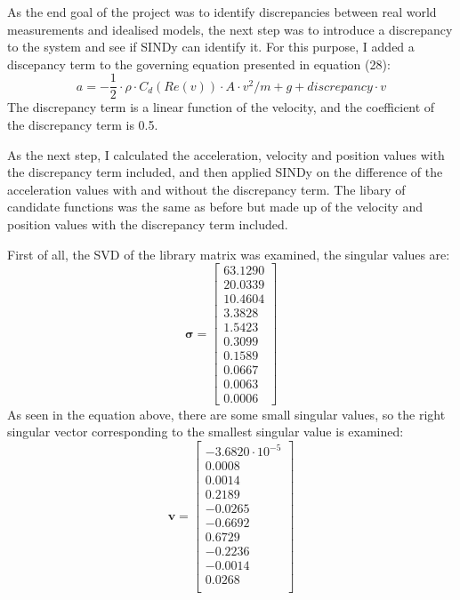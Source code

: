 ﻿\documentclass[12pt,a4paper]{article}
\begin{document}
As the end goal of the project was to identify discrepancies between
real world measurements and idealised models, the next step was to
introduce a discrepancy to the system and see if SINDy can identify it.
For this purpose, I added a discepancy term to the governing equation
presented in equation (28):
\begin{equation}
    a = - \frac{1}{2} \cdot \rho \cdot C_d(Re(v)) \cdot A \cdot v^2 / m + g + discrepancy \cdot v
\end{equation}
The discrepancy term is a linear function of the velocity, and the 
coefficient of the discrepancy term is 0.5. \par
As the next step, I calculated the acceleration, velocity and position values
with the discrepancy term included, and then applied SINDy on the
difference of the acceleration values with and without the discrepancy term.
The libary of candidate functions was the same as before but made up
of the velocity and position values with the discrepancy term included.\par
First of all, the SVD of the library matrix was examined, the singular values are:
\begin{equation}
    \bm{\sigma} = \begin{bmatrix}
        63.1290 \\
        20.0339 \\
        10.4604 \\
        3.3828 \\
        1.5423 \\
        0.3099 \\
        0.1589 \\
        0.0667 \\
        0.0063 \\
        0.0006
    \end{bmatrix}
\end{equation}
As seen in the equation above, there are some small singular values,
so the right singular vector corresponding to the smallest singular 
value is examined:
\begin{equation}
    \bm{v} = \begin{bmatrix}
    -3.6820 \cdot 10^{-5} \\
    0.0008 \\
    0.0014 \\
    0.2189 \\
    -0.0265 \\
    -0.6692 \\
    0.6729 \\
    -0.2236 \\
    -0.0014 \\
    0.0268 \\
    \end{bmatrix}
\end{equation}
\end{document}
